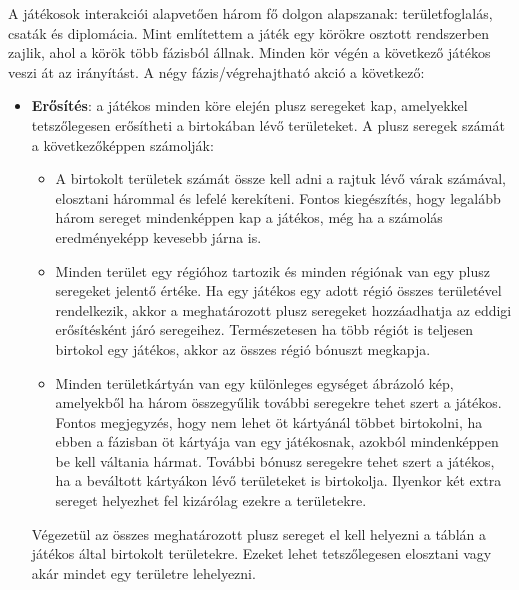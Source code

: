 \documentclass[
]{thesis-ekf}
\theoremstyle{definition}
\theoremstyle{remark}
\begin{document}
	A játékosok interakciói alapvetően három fő dolgon alapszanak: területfoglalás, csaták és diplomácia. Mint említettem a játék egy körökre osztott rendszerben zajlik, ahol a körök több fázisból állnak. Minden kör végén a következő játékos veszi át az irányítást. A négy fázis/végrehajtható akció a következő:
	
	\begin{itemize}
		\item \textbf{Erősítés}: a játékos minden köre elején plusz seregeket kap, amelyekkel tetszőlegesen erősítheti a birtokában lévő területeket. A plusz seregek számát a következőképpen számolják:
		\begin{itemize}
			\item A birtokolt területek számát össze kell adni a rajtuk lévő várak számával, elosztani hárommal és lefelé kerekíteni. Fontos kiegészítés, hogy legalább három sereget mindenképpen kap a játékos, még ha a számolás eredményeképp kevesebb járna is.
			\item Minden terület egy régióhoz tartozik és minden régiónak van egy plusz seregeket jelentő értéke. Ha egy játékos egy adott régió összes területével rendelkezik, akkor a meghatározott plusz seregeket hozzáadhatja az eddigi erősítésként járó seregeihez. Természetesen ha több régiót is teljesen birtokol egy játékos, akkor az összes régió bónuszt megkapja.
			\item Minden területkártyán van egy különleges egységet ábrázoló kép, amelyekből ha három összegyűlik további seregekre tehet szert a játékos. Fontos megjegyzés, hogy nem lehet öt kártyánál többet birtokolni, ha ebben a fázisban öt kártyája van egy játékosnak, azokból mindenképpen be kell váltania hármat. További bónusz seregekre tehet szert a játékos, ha a beváltott kártyákon lévő területeket is birtokolja. Ilyenkor két extra sereget helyezhet fel kizárólag ezekre a területekre.
		\end{itemize}
		Végezetül az összes meghatározott plusz sereget el kell helyezni a táblán a játékos által birtokolt területekre. Ezeket lehet tetszőlegesen elosztani vagy akár mindet egy területre lehelyezni.

\end{itemize}
\end{document}
